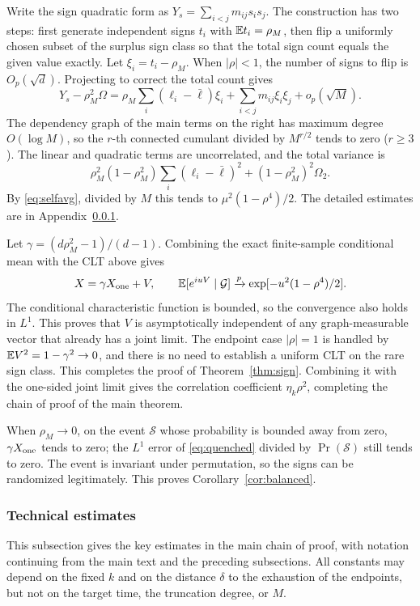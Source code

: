 Write the sign quadratic form as $Y_s=\sum_{i<j}m_{ij}s_i s_j$. The construction has two steps: first
generate independent signs $t_i$ with $\mathbb E t_i=\rho_M$, then flip a uniformly chosen subset of the surplus
sign class so that the total sign count equals the given value exactly. Let $\xi_i=t_i-\rho_M$. When
$|\rho|<1$, the number of signs to flip is $O_p(\sqrt d)$. Projecting to correct the total count gives
\begin{equation*}
Y_s-\rho_M^2\Omega=
\rho_M\sum_i(\ell_i-\bar\ell)\xi_i+
\sum_{i<j}m_{ij}\xi_i\xi_j+o_p(\sqrt M).
\end{equation*}
The dependency graph of the main terms on the right has maximum degree $O(\log M)$, so the $r$-th connected
cumulant divided by $M^{r/2}$ tends to zero ($r\ge3$). The linear and quadratic terms are uncorrelated, and
the total variance is
\begin{equation*}
\rho_M^2(1-\rho_M^2)\sum_i(\ell_i-\bar\ell)^2+(1-\rho_M^2)^2\Omega_2.
\end{equation*}
By \eqref{eq:selfavg}, divided by $M$ this tends to $\mu^2(1-\rho^4)/2$. The detailed estimates are in
Appendix~\ref{app:technical}.

Let $\gamma=(d\rho_M^2-1)/(d-1)$. Combining the exact finite-sample conditional mean with the CLT above gives
\begin{equation}
X=\gamma X_{\rm one}+V,\qquad
\mathbb E[e^{iuV}\mid\mathcal G]\xrightarrow p
\exp[-u^2(1-\rho^4)/2].\label{eq:quenched}
\end{equation}
The conditional characteristic function is bounded, so the convergence also holds in $L^1$. This proves that
$V$ is asymptotically independent of any graph-measurable vector that already has a joint limit. The endpoint
case $|\rho|=1$ is handled by $\mathbb E V^2=1-\gamma^2\to0$, and there is no need to establish a uniform CLT on
the rare sign class. This completes the proof of Theorem~\ref{thm:sign}. Combining it with the one-sided
joint limit gives the correlation coefficient $\eta_k\rho^2$, completing the chain of proof of the main
theorem.

When $\rho_M\to0$, on the event $\mathcal S$ whose probability is bounded away from zero, $\gamma X_{\rm
one}$ tends to zero; the $L^1$ error of \eqref{eq:quenched} divided by $\Pr(\mathcal S)$ still tends to
zero. The event is invariant under permutation, so the signs can be randomized legitimately. This proves
Corollary~\ref{cor:balanced}.

\subsubsection{Technical estimates}\label{app:technical}
This subsection gives the key estimates in the main chain of proof, with notation continuing from the main
text and the preceding subsections. All constants may depend on the fixed $k$ and on the distance $\delta$ to
the exhaustion of the endpoints, but not on the target time, the truncation degree, or $M$.

